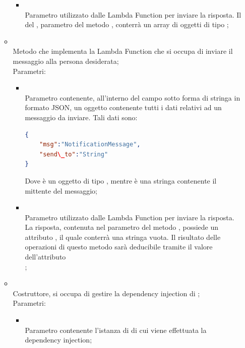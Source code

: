 \begin{itemize}
\begin{itemize}
\begin{itemize}
			\item {} \\
			Parametro utilizzato dalle Lambda Function per inviare la risposta. Il  del , parametro del metodo , conterrà un array di oggetti di tipo ;
		\end{itemize}
		\item[]  \\		Metodo che implementa la Lambda Function che si occupa di inviare il messaggio alla persona desiderata;\\
		Parametri:
		\begin{itemize}
			\item {} \\
			Parametro contenente, all'interno del campo  sotto forma di stringa in formato JSON, un oggetto contenente tutti i dati relativi ad un messaggio da inviare.
Tali dati sono:
\begin{lstlisting}[language=json,firstnumber=1]
{
    "msg":"NotificationMessage",
    "send\_to":"String"
}
\end{lstlisting}
Dove  è un oggetto di tipo , mentre  è una stringa contenente il mittente del messaggio;
			\item {} \\
			Parametro utilizzato dalle Lambda Function per inviare la risposta. La risposta, contenuta nel  parametro del metodo , possiede un attributo , il quale conterrà una stringa vuota. Il risultato delle operazioni di questo metodo sarà deducibile tramite il valore dell'attributo \\ ;
		\end{itemize}
		\item[]  \\		Costruttore, si occupa di gestire la dependency injection di ;\\
		Parametri:
		\begin{itemize}
			\item {} \\
			Parametro contenente l'istanza di  di cui viene effettuata la dependency injection;

\end{itemize}
\end{itemize}
\end{itemize}
